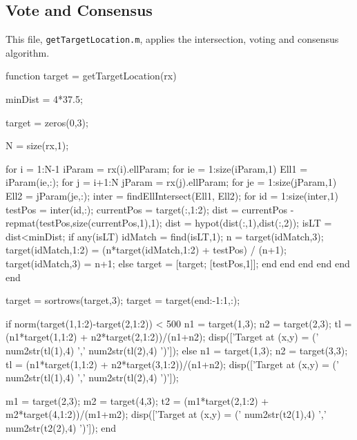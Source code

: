 \documentclass[12pt,openany,a4paper]{book}
\begin{document}
\subsection{Vote and Consensus}
\label{app:vote}
This file, \verb+getTargetLocation.m+, applies the intersection, voting and consensus algorithm.

\begin{spverbatim}
function target = getTargetLocation(rx)
%

minDist = 4*37.5; %

target = zeros(0,3);

N = size(rx,1);

for i = 1:N-1
    iParam = rx(i).ellParam;
    for ie = 1:size(iParam,1)
        Ell1 = iParam(ie,:);
        for j = i+1:N
            jParam = rx(j).ellParam;
            for je = 1:size(jParam,1)
                Ell2 = jParam(je,:);
                inter = findEllIntersect(Ell1, Ell2);
                for id = 1:size(inter,1)
                    testPos = inter(id,:);
                    currentPos = target(:,1:2);
                    dist = currentPos - repmat(testPos,size(currentPos,1),1);
                    dist = hypot(dist(:,1),dist(:,2));
                    isLT = dist<minDist;
                    if any(isLT)
                        idMatch = find(isLT,1);
                        n = target(idMatch,3);
                        target(idMatch,1:2) = (n*target(idMatch,1:2) + testPos) / (n+1);
                        target(idMatch,3) = n+1;
                    else
                        target = [target; [testPos,1]];
                    end
                end 
            end
        end
    end
end

target = sortrows(target,3);
target = target(end:-1:1,:);

if norm(target(1,1:2)-target(2,1:2)) < 500
    n1 = target(1,3);
    n2 = target(2,3);
    tl = (n1*target(1,1:2) + n2*target(2,1:2))/(n1+n2);
    disp(['Target at (x,y) = (' num2str(tl(1),4) ',' num2str(tl(2),4) ')']);
else
    n1 = target(1,3);
    n2 = target(3,3);
    tl = (n1*target(1,1:2) + n2*target(3,1:2))/(n1+n2);    
    disp(['Target at (x,y) = (' num2str(tl(1),4) ',' num2str(tl(2),4) ')']);
    
    m1 = target(2,3);
    m2 = target(4,3);
    t2 = (m1*target(2,1:2) + m2*target(4,1:2))/(m1+m2);    
    disp(['Target at (x,y) = (' num2str(t2(1),4) ',' num2str(t2(2),4) ')']);
end
\end{spverbatim}
\end{document}
